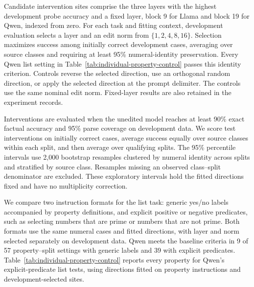 \documentclass[11pt]{article}
\begin{document}
Candidate intervention sites comprise the three layers with the highest development probe accuracy and a fixed layer, block 9 for Llama and block 19 for Qwen, indexed from zero.
For each task and fitting context, development evaluation selects a layer and an edit norm from $\{1,2,4,8,16\}$.
Selection maximizes success among initially correct development cases, averaging over source classes and requiring at least 95\% numeral-identity preservation.
Every Qwen list setting in Table~\ref{tab:individual-property-control} passes this identity criterion.
Controls reverse the selected direction, use an orthogonal random direction, or apply the selected direction at the prompt delimiter.
The controls use the same nominal edit norm.
Fixed-layer results are also retained in the experiment records.

Interventions are evaluated when the unedited model reaches at least 90\% exact factual accuracy and 95\% parse coverage on development data.
We score test interventions on initially correct cases, average success equally over source classes within each split, and then average over qualifying splits.
The 95\% percentile intervals use 2,000 bootstrap resamples clustered by numeral identity across splits and stratified by source class.
Resamples missing an observed class--split denominator are excluded.
These exploratory intervals hold the fitted directions fixed and have no multiplicity correction.

We compare two instruction formats for the list task: generic yes/no labels accompanied by property definitions, and explicit positive or negative predicates, such as selecting numbers that are prime or numbers that are not prime.
Both formats use the same numeral cases and fitted directions, with layer and norm selected separately on development data.
Qwen meets the baseline criteria in 9 of 57 property--split settings with generic labels and 39 with explicit predicates.
Table~\ref{tab:individual-property-control} reports every property for Qwen's explicit-predicate list tests, using directions fitted on property instructions and development-selected sites.
\end{document}
